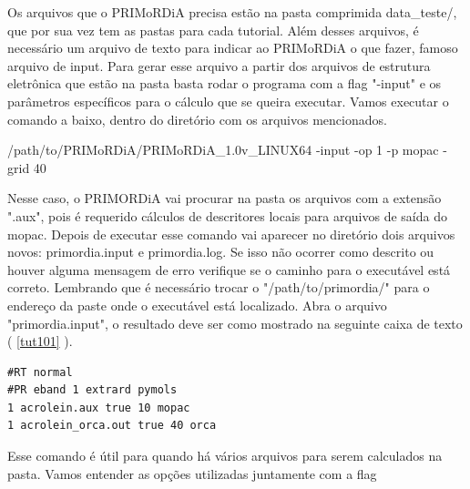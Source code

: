 \documentclass[a4paper,11pt]{refart}
\begin{document}
Os arquivos que o PRIMoRDiA precisa estão na pasta comprimida data\_teste/, que por sua vez tem as pastas para cada tutorial. Além desses arquivos, é necessário um arquivo de texto para indicar ao PRIMoRDiA o que fazer, famoso arquivo de input. Para gerar esse arquivo a partir dos arquivos de estrutura eletrônica que estão na pasta basta rodar o programa com a flag "-input" e os parâmetros específicos para o cálculo que se queira executar. Vamos executar o comando a baixo, dentro do diretório com os arquivos mencionados.

\hspace*{-\leftmarginwidth}
\begin{minipage}{\fullwidth}
\begin{commandshell}/path/to/PRIMoRDiA/PRIMoRDiA_1.0v_LINUX64 -input -op 1 -p mopac -grid 40\end{commandshell}
\end{minipage}

Nesse caso, o PRIMORDiA vai procurar na pasta os arquivos com a extensão ".aux", pois é requerido cálculos de descritores locais para arquivos de saída do mopac. Depois de executar esse comando vai aparecer no diretório dois arquivos novos: primordia.input e primordia.log. Se isso não ocorrer como descrito ou houver alguma mensagem de erro verifique se o caminho para o executável está correto. Lembrando que é necessário trocar o "/path/to/primordia/" para o endereço da paste onde o executável está localizado. Abra o arquivo "primordia.input", o resultado deve ser como mostrado na seguinte caixa de texto ( \autoref{tut101} ).

\begin{minipage}{\textwidth}
\begin{lstlisting}[caption={Input gerado pelo comando do PRIMoRDiA.},label={tut101}]
#RT normal 
#PR eband 1 extrard pymols
1 acrolein.aux true 10 mopac 
1 acrolein_orca.out true 40 orca 
\end{lstlisting}
\end{minipage}


Esse comando é útil para quando há vários arquivos para serem calculados na pasta. Vamos entender as opções utilizadas juntamente com a flag
\end{document}
